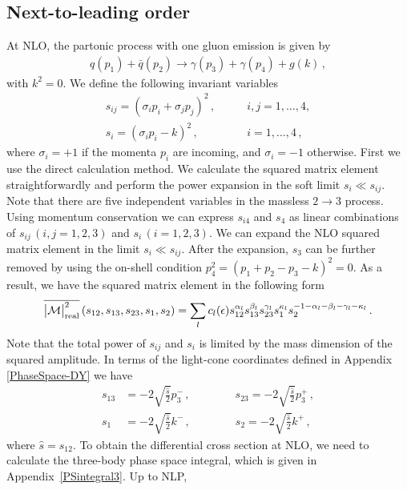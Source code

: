 \documentclass[11pt]{article}
\begin{document}
\subsection{Next-to-leading order}\label{sec:nlophoton}

At NLO, the partonic process with one 
gluon emission is given by
%
\begin{align}
q(p_1) + \bar{q}(p_2) \rightarrow \gamma(p_3) + \gamma(p_4) + g(k)\,,
\end{align}
%
with $k^2=0$. We define the following 
invariant variables
%
\begin{align}
s_{ij}=(\sigma_{i}p_i+\sigma_{j}p_j)^2\,, &\qquad i,j = 1,\dots ,4, \nonumber \\
s_{i}=(\sigma_{i}p_i-k)^2\,, &\qquad i= 1,\dots ,4 \,,
\end{align}
%
where $\sigma_{i}=+1$ if the momenta $p_{i}$ are incoming, and
$\sigma_{i}=-1$ otherwise. First we use the direct calculation method. We
calculate the squared matrix element straightforwardly and perform the
power expansion in the soft limit $s_i\ll s_{ij}$. Note that there
are five independent variables in the massless $2 \to 3$
process. Using momentum conservation we
can express $s_{i4}$ and $s_{4}$ as linear combinations of
$s_{ij}\, (i,j=1,2,3)$ and $s_i\, (i=1,2,3)$. We can expand the NLO
squared matrix element in the limit
$s_i\ll s_{ij}$. After the expansion, $s_3$ can be further removed by using the on-shell
condition $p_4^2=(p_1+p_2-p_3-k)^2=0$. As a result, we have the
squared matrix element in the following form
%
\begin{align}\label{eq:ampnlogeneral}
\overline{\big|\mathcal{M}\big|_{\rm real}^2}\left(s_{12},s_{13},s_{23},s_1,s_2\right)=\sum_{l}c_l(\epsilon)s_{12}^{\alpha_l}s_{13}^{\beta_l}s_{23}^{\gamma_l}s_{1}^{\kappa_l}s_{2}^{-1-\alpha_l-\beta_l-\gamma_l-\kappa_l}\,.
\end{align}
%
Note that the total power of $s_{ij}$ and $s_i$ is limited by the mass dimension of the squared amplitude. In terms of the light-cone coordinates defined in  Appendix \ref{PhaseSpace-DY} we have
%
\begin{align}
s_{13}&=-2\sqrt{\frac{\hat{s}}{2}}p_3^-\,,
\qquad \qquad 
s_{23}=-2\sqrt{\frac{\hat{s}}{2}}p_3^+\,, \nonumber \\
s_{1}&=-2\sqrt{\frac{\hat{s}}{2}}k^-\,,
\qquad \qquad 
s_{2}=-2\sqrt{\frac{\hat{s}}{2}}k^+\,,
\end{align}
%
where $\hat{s}=s_{12}$. To obtain the differential 
cross section at NLO, we need to calculate the 
three-body phase space integral, which is given in Appendix~\ref{PSintegral3}. Up to NLP, 
\end{document}
